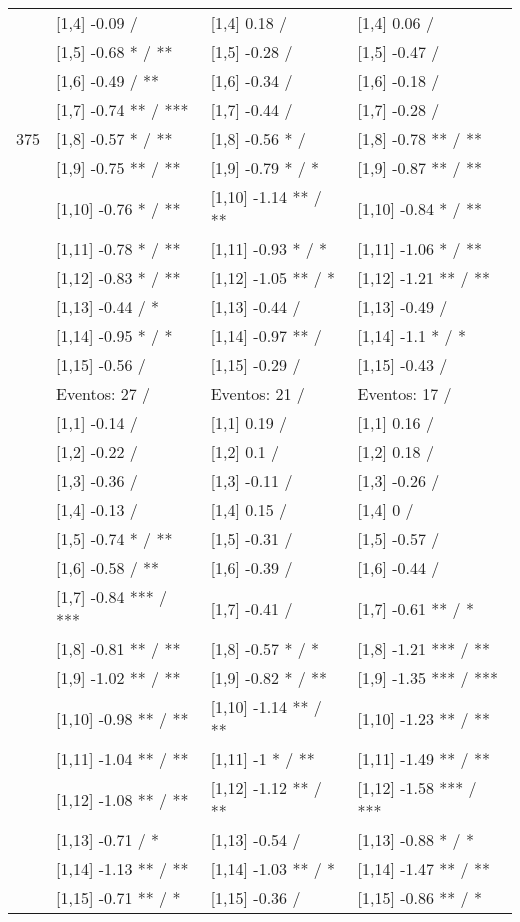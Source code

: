 \begin{table}
\begin{tabular}[t]{llll}
 & {}[1,4] -0.09  / & {}[1,4] 0.18  / & {}[1,4] 0.06  /\\
 & {}[1,5] -0.68 * / ** & {}[1,5] -0.28  / & {}[1,5] -0.47  /\\
 & {}[1,6] -0.49  / ** & {}[1,6] -0.34  / & {}[1,6] -0.18  /\\
 & {}[1,7] -0.74 ** / *** & {}[1,7] -0.44  / & {}[1,7] -0.28  /\\
375 & {}[1,8] -0.57 * / ** & {}[1,8] -0.56 * / & {}[1,8] -0.78 ** / **\\
\addlinespace
 & {}[1,9] -0.75 ** / ** & {}[1,9] -0.79 * / * & {}[1,9] -0.87 ** / **\\
 & {}[1,10] -0.76 * / ** & {}[1,10] -1.14 ** / ** & {}[1,10] -0.84 * / **\\
 & {}[1,11] -0.78 * / ** & {}[1,11] -0.93 * / * & {}[1,11] -1.06 * / **\\
 & {}[1,12] -0.83 * / ** & {}[1,12] -1.05 ** / * & {}[1,12] -1.21 ** / **\\
 & {}[1,13] -0.44  / * & {}[1,13] -0.44  / & {}[1,13] -0.49  /\\
\addlinespace
 & {}[1,14] -0.95 * / * & {}[1,14] -0.97 ** / & {}[1,14] -1.1 * / *\\
 & {}[1,15] -0.56  / & {}[1,15] -0.29  / & {}[1,15] -0.43  /\\
 & Eventos:  27 / & Eventos:  21 / & Eventos:  17 /\\
 & {}[1,1] -0.14  / & {}[1,1] 0.19  / & {}[1,1] 0.16  /\\
 & {}[1,2] -0.22  / & {}[1,2] 0.1  / & {}[1,2] 0.18  /\\
\addlinespace
 & {}[1,3] -0.36  / & {}[1,3] -0.11  / & {}[1,3] -0.26  /\\
 & {}[1,4] -0.13  / & {}[1,4] 0.15  / & {}[1,4] 0  /\\
 & {}[1,5] -0.74 * / ** & {}[1,5] -0.31  / & {}[1,5] -0.57  /\\
 & {}[1,6] -0.58  / ** & {}[1,6] -0.39  / & {}[1,6] -0.44  /\\
 & {}[1,7] -0.84 *** / *** & {}[1,7] -0.41  / & {}[1,7] -0.61 ** / *\\
\addlinespace
500 & {}[1,8] -0.81 ** / ** & {}[1,8] -0.57 * / * & {}[1,8] -1.21 *** / **\\
 & {}[1,9] -1.02 ** / ** & {}[1,9] -0.82 * / ** & {}[1,9] -1.35 *** / ***\\
 & {}[1,10] -0.98 ** / ** & {}[1,10] -1.14 ** / ** & {}[1,10] -1.23 ** / **\\
 & {}[1,11] -1.04 ** / ** & {}[1,11] -1 * / ** & {}[1,11] -1.49 ** / **\\
 & {}[1,12] -1.08 ** / ** & {}[1,12] -1.12 ** / ** & {}[1,12] -1.58 *** / ***\\
\addlinespace
 & {}[1,13] -0.71  / * & {}[1,13] -0.54  / & {}[1,13] -0.88 * / *\\
 & {}[1,14] -1.13 ** / ** & {}[1,14] -1.03 ** / * & {}[1,14] -1.47 ** / **\\
 & {}[1,15] -0.71 ** / * & {}[1,15] -0.36  / & {}[1,15] -0.86 ** / *\\
\bottomrule
\end{tabular}
\end{table}
